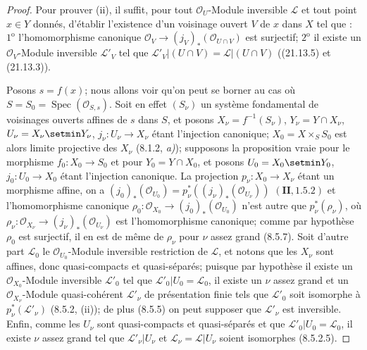 \begin{proof}
Pour prouver (ii), il suffit, pour tout $\mathcal O_U$-Module inversible $\mathscr L$
et tout point $x\in Y$ donnés, d'établir l'existence d'un voisinage ouvert $V$ de $x$
dans $X$ tel que : $1^{\mathrm o}$ l'homomorphisme canonique
$\mathcal O_V\to(j_V)_*(\mathcal O_{U\cap V})$ est surjectif;
$2^{\mathrm o}$ il existe un $\mathcal O_V$-Module inversible $\mathscr L'_V$ tel que
$\mathscr L'_V|(U\cap V)=\mathscr L|(U\cap V)$ ((21.13.5) et (21.13.3)).

Posons $s=f(x)$; nous allons voir qu'on peut se borner au cas où
$S=S_0=\operatorname{Spec}(\mathcal O_{S,s})$. Soit en effet $(S_\nu)$ un système
fondamental de voisinages ouverts affines de $s$ dans $S$, et posons
$X_\nu=f^{-1}(S_\nu)$, $Y_\nu=Y\cap X_\nu$, $U_\nu=X_\nu\setmin Y_\nu$,
$j_\nu:U_\nu\to X_\nu$ étant l'injection canonique; $X_0=X\times_S S_0$ est alors
limite projective des $X_\nu$ (8.1.2, \emph{a)}); supposons la proposition vraie pour le
morphisme $f_0:X_0\to S_0$ et pour $Y_0=Y\cap X_0$, et posons $U_0=X_0\setmin Y_0$,
$j_0:U_0\to X_0$ étant l'injection canonique. La projection
$p_\nu:X_0\to X_\nu$ étant un morphisme affine, on a $(j_0)_*(\mathcal O_{U_0})=p_\nu^*((j_\nu)_*(\mathcal O_{U_\nu}))$
$(\mathbf{II}, 1.5.2)$ et l'homomorphisme canonique
$\rho_0:\mathcal O_{X_0}\to(j_0)_*(\mathcal O_{U_0})$ n'est autre que
$p_\nu^*(\rho_\nu)$, où
$\rho_\nu:\mathcal O_{X_\nu}\to(j_\nu)_*(\mathcal O_{U_\nu})$ est l'homomorphisme
canonique; comme par hypothèse $\rho_0$ est surjectif, il en est de même de $\rho_\nu$
pour $\nu$ assez
grand (8.5.7). Soit d'autre part $\mathscr L_0$ le
$\mathcal O_{U_0}$-Module inversible restriction de $\mathscr L$, et notons que les
$X_\nu$ sont affines, donc quasi-compacts et quasi-séparés; puisque par hypothèse il
existe un $\mathcal O_{X_0}$-Module inversible $\mathscr L'_0$ tel que
$\mathscr L'_0|U_0=\mathscr L_0$, il existe un $\nu$ assez grand et un
$\mathcal O_{X_\nu}$-Module quasi-cohérent $\mathscr L'_\nu$ de présentation finie
tels que $\mathscr L'_0$ soit isomorphe à $p_\nu^*(\mathscr L'_\nu)$ (8.5.2, (ii));
de plus (8.5.5) on peut supposer que $\mathscr L'_\nu$ est inversible. Enfin, comme
les $U_\nu$ sont quasi-compacts et quasi-séparés et que
$\mathscr L'_0|U_0=\mathscr L_0$, il existe $\nu$ assez grand tel que
$\mathscr L'_\nu|U_\nu$ et $\mathscr L_\nu=\mathscr L|U_\nu$ soient isomorphes (8.5.2.5).


\end{proof}
